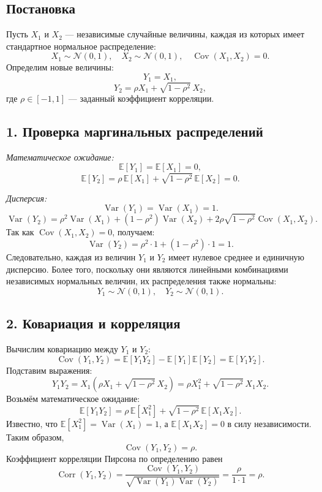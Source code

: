 \documentclass{article}
\begin{document}
\subsection*{Постановка}
Пусть \(X_1\) и \(X_2\) — независимые случайные величины, каждая из которых имеет стандартное нормальное распределение:
\[
X_1 \sim \mathcal{N}(0,1),\quad X_2 \sim \mathcal{N}(0,1),\quad \operatorname{Cov}(X_1,X_2)=0.
\]
Определим новые величины:
\[
Y_1 = X_1,
\]
\[
Y_2 = \rho X_1 + \sqrt{1-\rho^2}\,X_2,
\]
где \(\rho \in [-1,1]\) — заданный коэффициент корреляции.

\subsection*{1. Проверка маргинальных распределений}
\textit{Математическое ожидание:}
\[
\mathbb{E}[Y_1] = \mathbb{E}[X_1] = 0,
\]
\[
\mathbb{E}[Y_2] = \rho\,\mathbb{E}[X_1] + \sqrt{1-\rho^2}\,\mathbb{E}[X_2] = 0.
\]

\textit{Дисперсия:}
\[
\operatorname{Var}(Y_1) = \operatorname{Var}(X_1) = 1.
\]
\[
\operatorname{Var}(Y_2) = \rho^2\operatorname{Var}(X_1) + (1-\rho^2)\operatorname{Var}(X_2) + 2\rho\sqrt{1-\rho^2}\operatorname{Cov}(X_1,X_2).
\]
Так как \(\operatorname{Cov}(X_1,X_2)=0\), получаем:
\[
\operatorname{Var}(Y_2) = \rho^2\cdot 1 + (1-\rho^2)\cdot 1 = 1.
\]
Следовательно, каждая из величин \(Y_1\) и \(Y_2\) имеет нулевое среднее и единичную дисперсию. Более того, поскольку они являются линейными комбинациями независимых нормальных величин, их распределения также нормальны:
\[
Y_1 \sim \mathcal{N}(0,1),\quad Y_2 \sim \mathcal{N}(0,1).
\]

\subsection*{2. Ковариация и корреляция}
Вычислим ковариацию между \(Y_1\) и \(Y_2\):
\[
\operatorname{Cov}(Y_1,Y_2) = \mathbb{E}[Y_1Y_2] - \mathbb{E}[Y_1]\mathbb{E}[Y_2] = \mathbb{E}[Y_1Y_2].
\]
Подставим выражения:
\[
Y_1Y_2 = X_1\left(\rho X_1 + \sqrt{1-\rho^2}\,X_2\right) = \rho X_1^2 + \sqrt{1-\rho^2}\,X_1X_2.
\]
Возьмём математическое ожидание:
\[
\mathbb{E}[Y_1Y_2] = \rho\,\mathbb{E}[X_1^2] + \sqrt{1-\rho^2}\,\mathbb{E}[X_1X_2].
\]
Известно, что \(\mathbb{E}[X_1^2] = \operatorname{Var}(X_1) = 1\), а \(\mathbb{E}[X_1X_2] = 0\) в силу независимости. Таким образом,
\[
\operatorname{Cov}(Y_1,Y_2) = \rho.
\]
Коэффициент корреляции Пирсона по определению равен
\[
\operatorname{Corr}(Y_1,Y_2) = \frac{\operatorname{Cov}(Y_1,Y_2)}{\sqrt{\operatorname{Var}(Y_1)\operatorname{Var}(Y_2)}} = \frac{\rho}{1\cdot 1} = \rho.
\]
\end{document}
